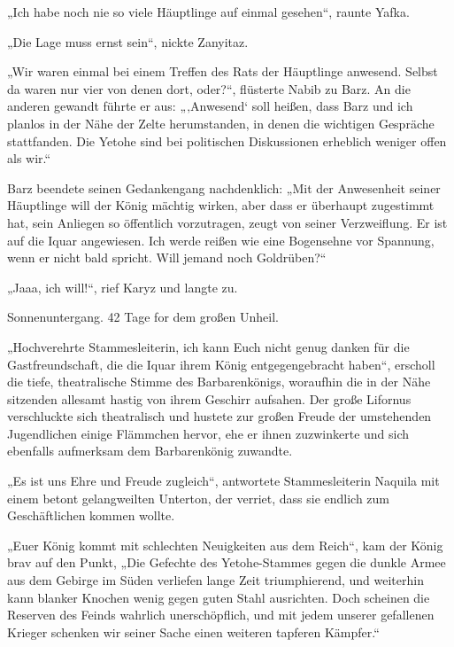 „Ich habe noch nie so viele Häuptlinge auf einmal gesehen“, raunte Yafka.

„Die Lage muss ernst sein“, nickte Zanyitaz.

„Wir waren einmal bei einem Treffen des Rats der Häuptlinge anwesend. Selbst da waren nur vier von denen dort, oder?“, flüsterte Nabib zu Barz. An die anderen gewandt führte er aus: „‚Anwesend‘ soll heißen, dass Barz und ich planlos in der Nähe der Zelte herumstanden, in denen die wichtigen Gespräche stattfanden. Die Yetohe sind bei politischen Diskussionen erheblich weniger offen als wir.“

Barz beendete seinen Gedankengang nachdenklich: „Mit der Anwesenheit seiner Häuptlinge will der König mächtig wirken, aber dass er überhaupt zugestimmt hat, sein Anliegen so öffentlich vorzutragen, zeugt von seiner Verzweiflung. Er ist auf die Iquar angewiesen. Ich werde reißen wie eine Bogensehne vor Spannung, wenn er nicht bald spricht. Will jemand noch Goldrüben?“

„Jaaa, ich will!“, rief Karyz und langte zu.



\trennzeichen



Sonnenuntergang. 42 Tage for dem großen Unheil.\bigskip



„Hochverehrte Stammesleiterin, ich kann Euch nicht genug danken für die Gastfreundschaft, die die Iquar ihrem König entgegengebracht haben“, erscholl die tiefe, theatralische Stimme des Barbarenkönigs, woraufhin die in der Nähe sitzenden allesamt hastig von ihrem Geschirr aufsahen. Der große Lifornus verschluckte sich theatralisch und hustete zur großen Freude der umstehenden Jugendlichen einige Flämmchen hervor, ehe er ihnen zuzwinkerte und sich ebenfalls aufmerksam dem Barbarenkönig zuwandte.

„Es ist uns Ehre und Freude zugleich“, antwortete Stammesleiterin Naquila mit einem betont gelangweilten Unterton, der verriet, dass sie endlich zum Geschäftlichen kommen wollte.

„Euer König kommt mit schlechten Neuigkeiten aus dem Reich“, kam der König brav auf den Punkt, „Die Gefechte des Yetohe-Stammes gegen die dunkle Armee aus dem Gebirge im Süden verliefen lange Zeit triumphierend, und weiterhin kann blanker Knochen wenig gegen guten Stahl ausrichten. Doch scheinen die Reserven des Feinds wahrlich unerschöpflich, und mit jedem unserer gefallenen Krieger schenken wir seiner Sache einen weiteren tapferen Kämpfer.“

